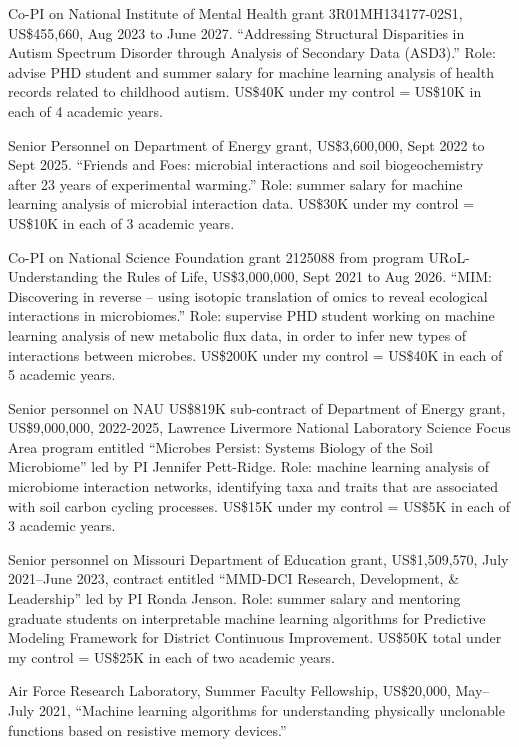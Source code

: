 \documentclass[margin,line]{res}
\begin{document}
\begin{resume}
Co-PI on National Institute of Mental Health grant 3R01MH134177-02S1,
US\$455,660, Aug 2023 to June 2027. ``Addressing Structural Disparities in Autism Spectrum Disorder through Analysis of Secondary Data (ASD3).'' Role: advise PHD student and summer salary for
machine learning analysis of health records related to childhood
autism. US\$40K under my control = US\$10K in each of 4 academic
years.

Senior Personnel on Department of Energy grant, US\$3,600,000, Sept 2022 to
Sept 2025. ``Friends and Foes: microbial interactions and soil
biogeochemistry after 23 years of experimental warming.'' Role: summer
salary for machine learning analysis of microbial interaction data.
US\$30K under my control = US\$10K in each of 3 academic years.

Co-PI on National Science Foundation grant 2125088 from program URoL-Understanding the Rules of Life, US\$3,000,000, Sept 2021
to Aug 2026. ``MIM: Discovering in reverse – using isotopic
translation of omics to reveal ecological interactions in
microbiomes.'' Role: supervise PHD student working on machine learning
analysis of new metabolic flux data, in order to infer new types of
interactions between microbes. US\$200K under my control = US\$40K in
each of 5 academic years.

Senior personnel on NAU US\$819K sub-contract of Department of Energy
grant, US\$9,000,000, 2022-2025, Lawrence Livermore National
Laboratory Science Focus Area program entitled ``Microbes Persist:
Systems Biology of the Soil Microbiome'' led by PI Jennifer
Pett-Ridge. Role: machine learning analysis of microbiome interaction
networks, identifying taxa and traits that are associated with soil
carbon cycling processes. US\$15K under my control = US\$5K in each of
3 academic years.

Senior personnel on Missouri Department of Education grant,
US\$1,509,570, July 2021--June 2023, contract entitled ``MMD-DCI
Research, Development, \& Leadership'' led by PI Ronda Jenson. Role:
summer salary and mentoring graduate students on interpretable machine
learning algorithms for Predictive Modeling Framework for District
Continuous Improvement. US\$50K total under my control = US\$25K in
each of two academic years.

Air Force Research Laboratory, Summer Faculty Fellowship, US\$20,000,
May--July 2021, ``Machine learning algorithms for understanding
physically unclonable functions based on resistive memory devices.''


\end{resume}
\end{document}

